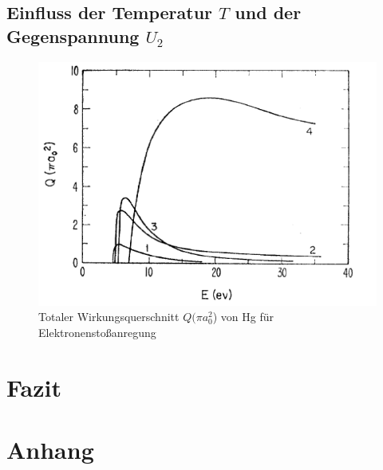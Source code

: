 \documentclass{article}
\begin{document}
\begin{multicols}{2}
\subsection{Einfluss der Temperatur $T$ und der Gegenspannung $U_2$}
\begin{figure}[H]
  \centering
  \includegraphics[scale=0.55]{Totaler Wirkungsquerschnitt.png}
  \caption{Totaler Wirkungsquerschnitt $Q(\pi a^2_0$) von Hg für Elektronenstoßanregung}
\end{figure}



\section{Fazit}
\end{multicols}
\clearpage

\section*{Anhang}
\end{document}
